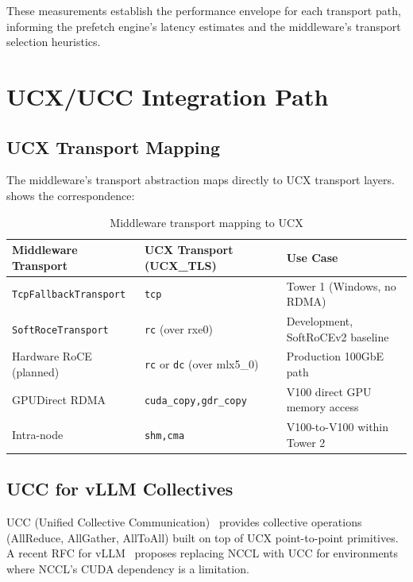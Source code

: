 \documentclass[11pt,letterpaper]{article}
\theoremstyle{definition}
\begin{document}
These measurements establish the performance envelope for each transport path, informing the prefetch engine's latency estimates and the middleware's transport selection heuristics.

\section{UCX/UCC Integration Path}
\label{sec:ucx-ucc}

\subsection{UCX Transport Mapping}

The middleware's transport abstraction maps directly to UCX transport layers.  shows the correspondence:

\begin{table}[htbp]
\centering
\caption{Middleware transport mapping to UCX}
\label{tab:ucx-mapping}
\begin{tabular}{@{}lll@{}}
\toprule
\textbf{Middleware Transport} & \textbf{UCX Transport (UCX\_TLS)} & \textbf{Use Case} \\
\midrule
\texttt{TcpFallbackTransport} & \texttt{tcp} & Tower 1 (Windows, no RDMA) \\
\texttt{SoftRoceTransport} & \texttt{rc} (over rxe0) & Development, SoftRoCEv2 baseline \\
Hardware RoCE (planned) & \texttt{rc} or \texttt{dc} (over mlx5\_0) & Production 100GbE path \\
GPUDirect RDMA & \texttt{cuda\_copy,gdr\_copy} & V100 direct GPU memory access \\
Intra-node & \texttt{shm,cma} & V100-to-V100 within Tower 2 \\
\bottomrule
\end{tabular}
\end{table}

\subsection{UCC for vLLM Collectives}

UCC (Unified Collective Communication)~\cite{ucc} provides collective operations (AllReduce, AllGather, AllToAll) built on top of UCX point-to-point primitives. A recent RFC for vLLM~\cite{vllm-ucc-rfc} proposes replacing NCCL with UCC for environments where NCCL's CUDA dependency is a limitation.
\end{document}
